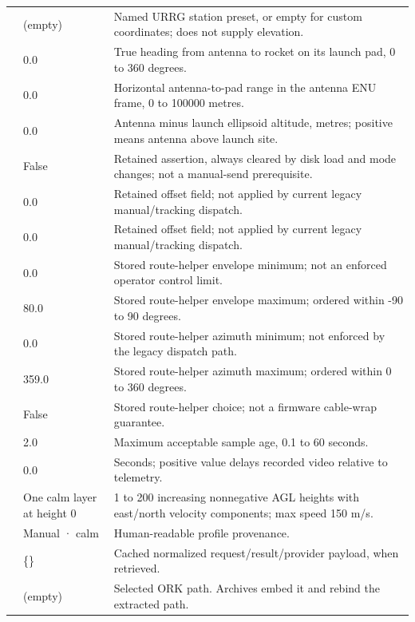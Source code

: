 \begin{longtable}{@{}L{.28\linewidth}L{.18\linewidth}L{.47\linewidth}@{}}
 & (empty) & Named URRG station preset, or empty for custom coordinates; does not supply elevation. \\
 & 0.0 & True heading from antenna to rocket on its launch pad, 0 to 360 degrees. \\
 & 0.0 & Horizontal antenna-to-pad range in the antenna ENU frame, 0 to 100000 metres. \\
 & 0.0 & Antenna minus launch ellipsoid altitude, metres; positive means antenna above launch site. \\
 & False & Retained assertion, always cleared by disk load and mode changes; not a manual-send prerequisite. \\
 & 0.0 & Retained offset field; not applied by current legacy manual/tracking dispatch. \\
 & 0.0 & Retained offset field; not applied by current legacy manual/tracking dispatch. \\
 & 0.0 & Stored route-helper envelope minimum; not an enforced operator control limit. \\
 & 80.0 & Stored route-helper envelope maximum; ordered within -90 to 90 degrees. \\
 & 0.0 & Stored route-helper azimuth minimum; not enforced by the legacy dispatch path. \\
 & 359.0 & Stored route-helper azimuth maximum; ordered within 0 to 360 degrees. \\
 & False & Stored route-helper choice; not a firmware cable-wrap guarantee. \\
 & 2.0 & Maximum acceptable sample age, 0.1 to 60 seconds. \\
 & 0.0 & Seconds; positive value delays recorded video relative to telemetry. \\
 & One calm layer at height 0 & 1 to 200 increasing nonnegative AGL heights with east/north velocity components; max speed 150 m/s. \\
 & Manual · calm & Human-readable profile provenance. \\
 & \{\} & Cached normalized request/result/provider payload, when retrieved. \\
 & (empty) & Selected ORK path. Archives embed it and rebind the extracted path. \\

\end{longtable}
